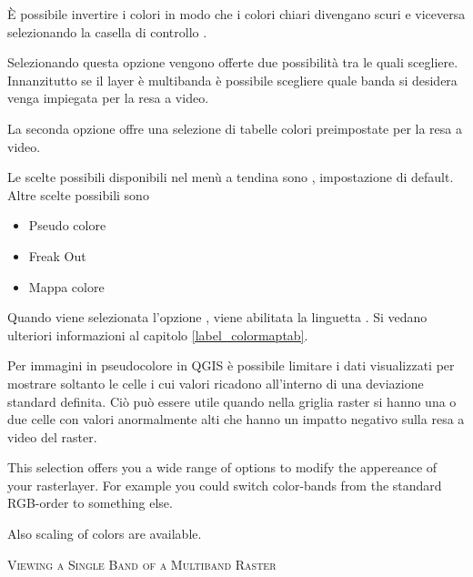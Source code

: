 È possibile invertire i colori in modo che i colori chiari divengano scuri e
viceversa selezionando la casella di controllo .


Selezionando questa opzione vengono offerte due possibilità tra le quali
scegliere. Innanzitutto se il layer è multibanda è possibile scegliere quale
banda si desidera venga impiegata per la resa a video. 

La seconda opzione offre una selezione di tabelle colori preimpostate per la
resa a video.

Le scelte possibili disponibili nel menù a tendina sono
, impostazione di default.
Altre scelte possibili sono
\begin{itemize}
\item Pseudo colore
\item Freak Out
\item Mappa colore
\end{itemize}

Quando viene selezionata l'opzione ,
viene abilitata la linguetta . Si vedano ulteriori
informazioni al capitolo \ref{label_colormaptab}.

Per immagini in pseudocolore in QGIS è possibile limitare i dati visualizzati
per mostrare soltanto le celle i cui valori ricadono all'interno di una deviazione standard
definita. Ciò può essere utile quando
nella griglia raster si hanno una o due celle con valori anormalmente alti
che hanno un impatto negativo sulla resa a video del raster.


This selection offers you a wide range of options to modify the appereance
of your rasterlayer. For example you could switch color-bands from the
standard RGB-order to something else.

Also scaling of colors are available.


\begin{Tip}\caption{\textsc{Viewing a Single Band of a Multiband Raster}}
\end{Tip} 

